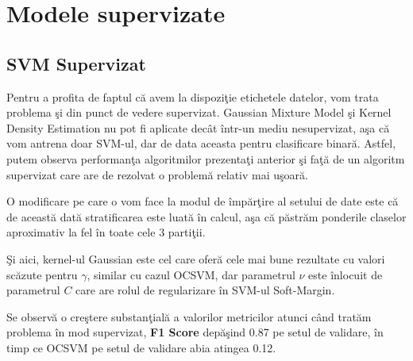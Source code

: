 \noindent

\section{Modele supervizate}

\subsection{SVM Supervizat}

Pentru a profita de faptul că avem la dispoziţie etichetele datelor, vom trata 
problema şi din punct de vedere supervizat. Gaussian Mixture Model şi Kernel 
Density Estimation nu pot fi aplicate decât într-un mediu nesupervizat, aşa 
că vom antrena doar SVM-ul, dar de data aceasta pentru clasificare binară.
Astfel, putem observa performanţa algoritmilor prezentaţi anterior şi faţă 
de un algoritm supervizat care are de rezolvat o problemă relativ mai uşoară.

O modificare pe care o vom face la modul de împărţire al setului de date 
este că de această dată stratificarea este luată în calcul, aşa că păstrăm 
ponderile claselor aproximativ la fel în toate cele 3 partiţii.

Şi aici, kernel-ul Gaussian este cel care oferă cele mai bune rezultate cu 
valori scăzute pentru $\gamma$, similar cu cazul OCSVM, dar parametrul 
$\nu$ este înlocuit
de parametrul $C$ care are rolul de regularizare în SVM-ul Soft-Margin.

Se observă o creştere substanţială a valorilor metricilor atunci când tratăm 
problema în mod supervizat, \textbf{F1 Score} 
depăşind 0.87 pe setul de validare, în timp ce 
OCSVM pe setul de validare abia atingea 0.12.

